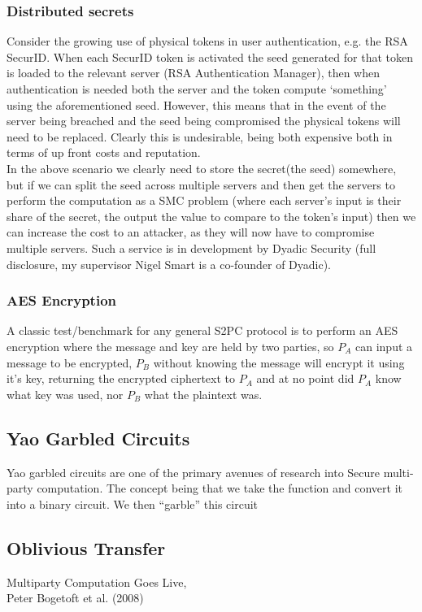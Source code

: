 \documentclass[a4paper,10pt]{article}
\begin{document}
      \subsubsection{Distributed secrets} \label{DistributedSecretApplication}
		Consider the growing use of physical tokens in user authentication, e.g. the RSA SecurID. When each SecurID token is activated the seed generated for that token is loaded to the relevant server (RSA Authentication Manager), then when authentication is needed both the server and the token compute `something' using the aforementioned seed. However, this means that in the event of the server being breached and the seed being compromised the physical tokens will need to be replaced. Clearly this is undesirable, being both expensive both in terms of up front costs and reputation.\\

		In the above scenario we clearly need to store the secret(the seed) somewhere, but if we can split the seed across multiple servers and then get the servers to perform the computation as a SMC problem (where each server's input is their share of the secret, the output the value to compare to the token's input) then we can increase the cost to an attacker, as they will now have to compromise multiple servers. Such a service is in development by Dyadic Security (full disclosure, my supervisor Nigel Smart is a co-founder of Dyadic).

      \subsubsection{AES Encryption} \label{AES_Application}
		A classic test/benchmark for any general S2PC protocol is to perform an AES encryption where the message and key are held by two parties, so $P_A$ can input a message to be encrypted, $P_B$ without knowing the message will encrypt it using it's key, returning the encrypted ciphertext to $P_A$ and at no point did $P_A$ know what key was used, nor $P_B$ what the plaintext was.

    
    \subsection{Yao Garbled Circuits} \label{Yao_Introduction}

	Yao garbled circuits are one of the primary avenues of research into Secure multi-party computation. The concept being that we take the function and convert it into a binary circuit. We then ``garble'' this circuit

    \subsection{Oblivious Transfer} \label{OT_Intro}




\begin{thebibliography}{5}


Multiparty Computation Goes Live,\\
Peter Bogetoft et al. (2008)


\end{thebibliography}
\end{document}
